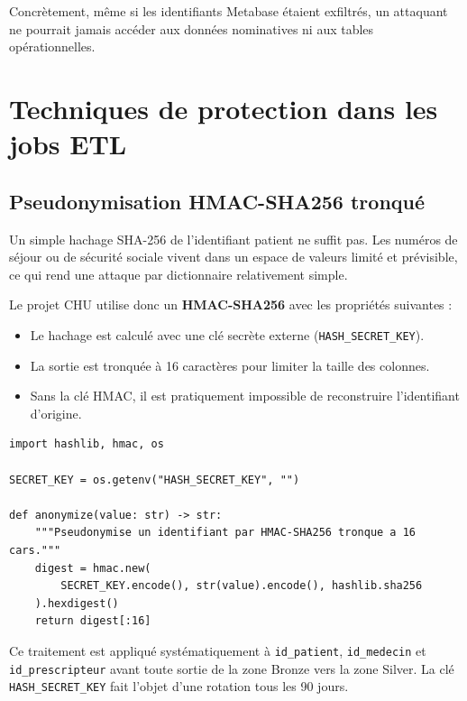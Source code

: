 \documentclass[12pt, a4paper]{report}
\begin{document}
\begin{itemize}[label=\textcolor{chuBlue}{\textbullet}]
Concrètement, même si les identifiants Metabase étaient exfiltrés, un attaquant ne pourrait jamais accéder aux données nominatives ni aux tables opérationnelles.


\section{Techniques de protection dans les jobs ETL}

\subsection{Pseudonymisation HMAC-SHA256 tronqué}

Un simple hachage SHA-256 de l'identifiant patient ne suffit pas. Les numéros de séjour ou de sécurité sociale vivent dans un espace de valeurs limité et prévisible, ce qui rend une attaque par dictionnaire relativement simple.

Le projet CHU utilise donc un \textbf{HMAC-SHA256} avec les propriétés suivantes :

\begin{itemize}[label=\textcolor{chuBlue}{\textbullet}]
  \item Le hachage est calculé avec une clé secrète externe (\texttt{HASH\_SECRET\_KEY}).
  \item La sortie est tronquée à 16 caractères pour limiter la taille des colonnes.
  \item Sans la clé HMAC, il est pratiquement impossible de reconstruire l'identifiant d'origine.
\end{itemize}

\begin{lstlisting}[style=python, caption={Pseudonymisation HMAC-SHA256 dans le module ETL}, label={lst:hmac}]
import hashlib, hmac, os

SECRET_KEY = os.getenv("HASH_SECRET_KEY", "")

def anonymize(value: str) -> str:
    """Pseudonymise un identifiant par HMAC-SHA256 tronque a 16 cars."""
    digest = hmac.new(
        SECRET_KEY.encode(), str(value).encode(), hashlib.sha256
    ).hexdigest()
    return digest[:16]
\end{lstlisting}

Ce traitement est appliqué systématiquement à \texttt{id\_patient}, \texttt{id\_medecin} et \texttt{id\_prescripteur} avant toute sortie de la zone Bronze vers la zone Silver. La clé \texttt{HASH\_SECRET\_KEY} fait l'objet d'une rotation tous les 90 jours.


\end{itemize}
\end{document}
